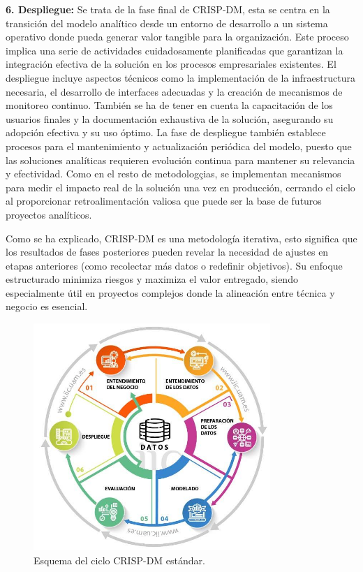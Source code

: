 \textbf{6. Despliegue:} Se trata de la fase final de CRISP-DM, esta se centra en la transición del modelo analítico desde un entorno de desarrollo a un sistema operativo donde pueda generar valor tangible para la organización. Este proceso implica una serie de actividades cuidadosamente planificadas que garantizan la integración efectiva de la solución en los procesos empresariales existentes. El despliegue incluye aspectos técnicos como la implementación de la infraestructura necesaria, el desarrollo de interfaces adecuadas y la creación de mecanismos de monitoreo continuo. También se ha de tener en cuenta la capacitación de los usuarios finales y la documentación exhaustiva de la solución, asegurando su adopción efectiva y su uso óptimo. La fase de despliegue también establece procesos para el mantenimiento y actualización periódica del modelo, puesto que las soluciones analíticas requieren evolución continua para mantener su relevancia y efectividad. Como en el resto de metodologçias, se implementan mecanismos para medir el impacto real de la solución una vez en producción, cerrando el ciclo al proporcionar retroalimentación valiosa que puede ser la base de futuros proyectos analíticos.

Como se ha explicado, CRISP-DM es una metodología iterativa, esto significa que los resultados de fases posteriores pueden revelar la necesidad de ajustes en etapas anteriores (como recolectar más datos o redefinir objetivos). Su enfoque estructurado minimiza riesgos y maximiza el valor entregado, siendo especialmente útil en proyectos complejos donde la alineación entre técnica y negocio es esencial.

\begin{figure}[htbp]
    \centering
    \includegraphics[width=0.8\textwidth]{./img/metodologia/crispdm.jpeg}
    \caption{Esquema del ciclo CRISP-DM estándar. \cite{haya_crisp_dm}}
    \label{fig:CRISP-DM}
\end{figure}